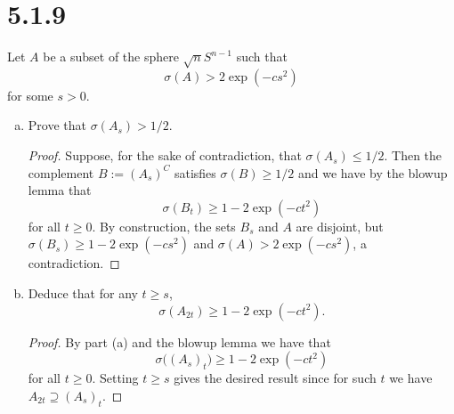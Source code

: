 \documentclass[11pt,letterpaper]{report}
\begin{document}
\section*{5.1.9}
Let $A$ be a subset of the sphere $\sqrt{n}S^{n-1}$ such that
\[
\sigma(A) > 2\exp(-cs^2)
\]
for some $s>0$.
\begin{enumerate}[(a)]
	\item Prove that $\sigma(A_s)>1/2$.
	\begin{proof}
		Suppose, for the sake of contradiction, that $\sigma(A_s)\leq 1/2$. Then the complement $B:= (A_s)^C$ satisfies $\sigma(B)\geq 1/2$ and we have by the blowup lemma that
		\[
		\sigma(B_t) \geq 1-2\exp(-ct^2)
		\]
		for all $t\geq 0$. By construction, the sets $B_s$ and $A$ are disjoint, but $\sigma(B_s)\geq 1-2\exp(-cs^2)$ and $\sigma(A)>2\exp(-cs^2)$, a contradiction.
	\end{proof}

	\item Deduce that for any $t\geq s$,
	\[
	\sigma(A_{2t}) \geq 1-2\exp(-ct^2).
	\]
	\begin{proof}
		By part (a) and the blowup lemma we have that
		\[
		\sigma\big((A_s)_t \big) \geq 1-2\exp(-ct^2)
		\]
		for all $t\geq 0$. Setting $t\geq s$ gives the desired result since for such $t$ we have $A_{2t}\supseteq (A_s)_t$.
	\end{proof}
\end{enumerate}
\end{document}
